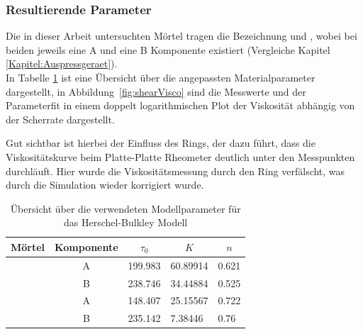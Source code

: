 \subsubsection{Resultierende Parameter}
Die in dieser Arbeit untersuchten Mörtel tragen die Bezeichnung \hit{} und \re{}, wobei bei beiden jeweils eine A und eine B Komponente existiert (Vergleiche Kapitel \ref{Kapitel:Auspressgeraet}).\\
In Tabelle \ref{fig:resultParameter} ist eine Übersicht über die angepassten Materialparameter dargestellt, in Abbildung~\ref{fig:shearVisco} sind die Messwerte und der Parameterfit in einem doppelt logarithmischen Plot der Viskosität abhängig von der Scherrate dargestellt.

Gut sichtbar ist hierbei der Einfluss des Rings, der dazu führt, dass die Viskositätskurve beim Platte-Platte Rheometer deutlich unter den Messpunkten durchläuft.
Hier wurde die Viskositätsmessung durch den Ring verfälscht, was durch die Simulation wieder korrigiert wurde.
\begin{table}
    \centering
    \begin{tabular}{l c l l l}
        \textbf{Mörtel} & \textbf{Komponente} & 
        \multicolumn{1}{c}{$\tau_0$} &
        \multicolumn{1}{c}{$K$} &
        \multicolumn{1}{c}{$n$} \\
        \hline
        \hline
        \multirow{2}{*}{\hit{}} & A & 199.983 & 60.89914 & 0.621 \\ 
                                & B & 238.746 & 34.44884 & 0.525 \\ 
        \hline
        \multirow{2}{*}{\re{}}  & A & 148.407 & 25.15567 & 0.722 \\ 
                                & B & 235.142 & 7.38446  & 0.76
    \end{tabular}
    \caption{Übersicht über die verwendeten Modellparameter für das Herschel-Bulkley Modell}
    \label{fig:resultParameter}
\end{table}
%
